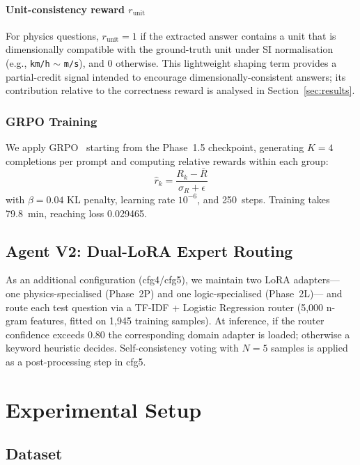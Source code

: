 \documentclass{ieeeaccess}
\begin{document}
\paragraph{Unit-consistency reward $r_{\text{unit}}$}
For physics questions, $r_{\text{unit}} = 1$ if the extracted answer contains
a unit that is dimensionally compatible with the ground-truth unit under
SI normalisation (e.g., \texttt{km/h} $\sim$ \texttt{m/s}), and $0$
otherwise.
This lightweight shaping term provides a partial-credit signal intended
to encourage dimensionally-consistent answers; its contribution relative
to the correctness reward is analysed in Section~\ref{sec:results}.

\subsubsection{GRPO Training}

We apply GRPO~\cite{Shao2024} starting from the Phase~1.5 checkpoint,
generating $K=4$ completions per prompt and computing relative rewards
within each group:
\begin{equation}
  \hat{r}_k = \frac{R_k - \bar{R}}{\sigma_R + \epsilon}
\end{equation}
with $\beta = 0.04$ KL penalty, learning rate $10^{-6}$, and 250~steps.
Training takes 79.8~min, reaching loss 0.029465.

\subsection{Agent V2: Dual-LoRA Expert Routing}

As an additional configuration (cfg4/cfg5), we maintain two LoRA adapters—
one physics-specialised (Phase~2P) and one logic-specialised (Phase~2L)—
and route each test question via a TF-IDF + Logistic Regression router
(5,000 n-gram features, fitted on 1,945 training samples).
At inference, if the router confidence exceeds 0.80 the corresponding
domain adapter is loaded; otherwise a keyword heuristic decides.
Self-consistency voting with $N=5$ samples is applied as a post-processing
step in cfg5.

\section{Experimental Setup}
\label{sec:setup}

\subsection{Dataset}
\end{document}
